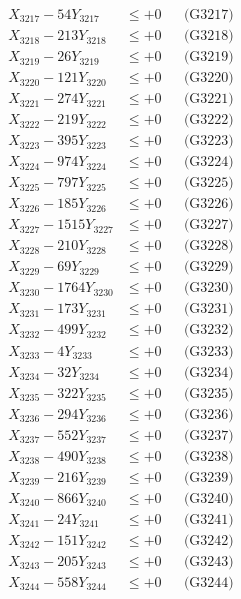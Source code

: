 \documentclass[a4paper,10pt]{article}
\begin{document}
{\begin{align}
X_{3217} - 54Y_{3217} &\leq +0 && \text{(G3217)} \\
X_{3218} - 213Y_{3218} &\leq +0 && \text{(G3218)} \\
X_{3219} - 26Y_{3219} &\leq +0 && \text{(G3219)} \\
X_{3220} - 121Y_{3220} &\leq +0 && \text{(G3220)} \\
\allowbreak
X_{3221} - 274Y_{3221} &\leq +0 && \text{(G3221)} \\
X_{3222} - 219Y_{3222} &\leq +0 && \text{(G3222)} \\
X_{3223} - 395Y_{3223} &\leq +0 && \text{(G3223)} \\
X_{3224} - 974Y_{3224} &\leq +0 && \text{(G3224)} \\
X_{3225} - 797Y_{3225} &\leq +0 && \text{(G3225)} \\
X_{3226} - 185Y_{3226} &\leq +0 && \text{(G3226)} \\
X_{3227} - 1515Y_{3227} &\leq +0 && \text{(G3227)} \\
X_{3228} - 210Y_{3228} &\leq +0 && \text{(G3228)} \\
X_{3229} - 69Y_{3229} &\leq +0 && \text{(G3229)} \\
X_{3230} - 1764Y_{3230} &\leq +0 && \text{(G3230)} \\
\allowbreak
X_{3231} - 173Y_{3231} &\leq +0 && \text{(G3231)} \\
X_{3232} - 499Y_{3232} &\leq +0 && \text{(G3232)} \\
X_{3233} - 4Y_{3233} &\leq +0 && \text{(G3233)} \\
X_{3234} - 32Y_{3234} &\leq +0 && \text{(G3234)} \\
X_{3235} - 322Y_{3235} &\leq +0 && \text{(G3235)} \\
X_{3236} - 294Y_{3236} &\leq +0 && \text{(G3236)} \\
X_{3237} - 552Y_{3237} &\leq +0 && \text{(G3237)} \\
X_{3238} - 490Y_{3238} &\leq +0 && \text{(G3238)} \\
X_{3239} - 216Y_{3239} &\leq +0 && \text{(G3239)} \\
X_{3240} - 866Y_{3240} &\leq +0 && \text{(G3240)} \\
\allowbreak
X_{3241} - 24Y_{3241} &\leq +0 && \text{(G3241)} \\
X_{3242} - 151Y_{3242} &\leq +0 && \text{(G3242)} \\
X_{3243} - 205Y_{3243} &\leq +0 && \text{(G3243)} \\
X_{3244} - 558Y_{3244} &\leq +0 && \text{(G3244)} \\

\end{align}}
\end{document}

